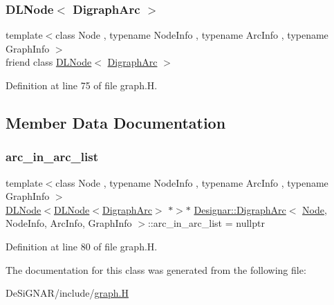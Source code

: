 \subsubsection{\texorpdfstring{D\+L\+Node$<$ Digraph\+Arc $>$}{DLNode< DigraphArc >}}
{\footnotesize\ttfamily template$<$class Node , typename Node\+Info , typename Arc\+Info , typename Graph\+Info $>$ \\
friend class \hyperlink{class_designar_1_1_d_l_node}{D\+L\+Node}$<$ \hyperlink{class_designar_1_1_digraph_arc}{Digraph\+Arc} $>$\hspace{0.3cm}{\ttfamily [friend]}}



Definition at line 75 of file graph.\+H.



\subsection{Member Data Documentation}
\mbox{\label{class_designar_1_1_digraph_arc_a1b269dc44c4b3696cb79e86a97afbdd7}} 
\subsubsection{\texorpdfstring{arc\+\_\+in\+\_\+arc\+\_\+list}{arc\_in\_arc\_list}}
{\footnotesize\ttfamily template$<$class Node , typename Node\+Info , typename Arc\+Info , typename Graph\+Info $>$ \\
\hyperlink{class_designar_1_1_d_l_node}{D\+L\+Node}$<$\hyperlink{class_designar_1_1_d_l_node}{D\+L\+Node}$<$\hyperlink{class_designar_1_1_digraph_arc}{Digraph\+Arc}$>$ $\ast$$>$$\ast$ \hyperlink{class_designar_1_1_digraph_arc}{Designar\+::\+Digraph\+Arc}$<$ \hyperlink{namespace_designar_a5af326c65aa2bd26b26c410f2030d09e}{Node}, Node\+Info, Arc\+Info, Graph\+Info $>$\+::arc\+\_\+in\+\_\+arc\+\_\+list = nullptr\hspace{0.3cm}{\ttfamily [protected]}}



Definition at line 80 of file graph.\+H.



The documentation for this class was generated from the following file\+:\begin{DoxyCompactItemize}
\item 
De\+Si\+G\+N\+A\+R/include/\hyperlink{graph_8_h}{graph.\+H}\end{DoxyCompactItemize}
